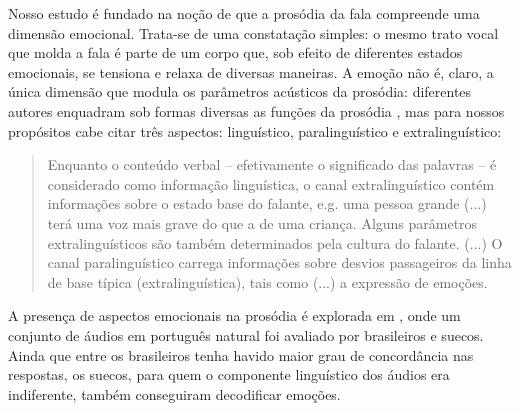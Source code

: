 \documentclass[a4paper]{tufte-handout}
\begin{document}
Nosso estudo é fundado na noção de que a prosódia da fala compreende uma dimensão emocional. Trata-se de uma constatação simples: o mesmo trato vocal que molda a fala é parte de um corpo que, sob efeito de diferentes estados emocionais, se tensiona e relaxa de diversas maneiras. A emoção não é, claro, a única dimensão que modula os parâmetros acústicos da prosódia: diferentes autores enquadram sob formas diversas as funções da prosódia \citep{schotz2002linguistic}, mas para nossos propósitos cabe citar três aspectos: linguístico, paralinguístico e extralinguístico: 

\begin{quotation}
    Enquanto o conteúdo verbal -- efetivamente o significado das palavras -- é considerado como informação linguística, o canal extralinguístico contém informações sobre o estado base do falante, e.g. uma pessoa grande (...) terá uma voz mais grave do que a de uma criança. Alguns parâmetros extralinguísticos são também determinados pela cultura do falante. (...) O canal paralinguístico carrega informações sobre desvios passageiros da linha de base típica (extralinguística), tais como (...) a expressão de emoções. 
\end{quotation}

A presença de aspectos emocionais na prosódia é explorada em \citet{SILVA2016}, onde um conjunto de áudios em português natural foi avaliado por brasileiros e suecos. Ainda que entre os brasileiros tenha havido maior grau de concordância nas respostas, os suecos, para quem o componente linguístico dos áudios era indiferente, também conseguiram decodificar emoções.
\end{document}
